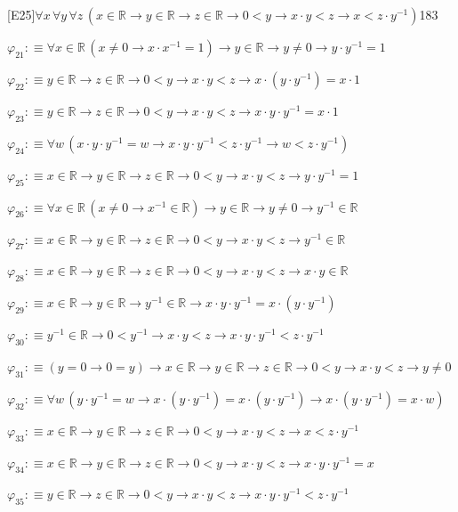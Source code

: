 \begin{fullproof}{[E25]}{$\forall x\,\forall y\,\forall z\,(x \in \mathbb{R} \to y \in \mathbb{R} \to z \in \mathbb{R} \to 0 < y \to x \cdot y < z \to x < z \cdot y^{-1})$}{183}
\begin{abbrevlist}
\item $\varphi_{21} :\equiv \forall x \in \mathbb{R}\,(x \neq 0 \to x \cdot x^{-1} = 1) \to y \in \mathbb{R} \to y \neq 0 \to y \cdot y^{-1} = 1$
\item $\varphi_{22} :\equiv y \in \mathbb{R} \to z \in \mathbb{R} \to 0 < y \to x \cdot y < z \to x \cdot (y \cdot y^{-1}) = x \cdot 1$
\item $\varphi_{23} :\equiv y \in \mathbb{R} \to z \in \mathbb{R} \to 0 < y \to x \cdot y < z \to x \cdot y \cdot y^{-1} = x \cdot 1$
\item $\varphi_{24} :\equiv \forall w\,(x \cdot y \cdot y^{-1} = w \to x \cdot y \cdot y^{-1} < z \cdot y^{-1} \to w < z \cdot y^{-1})$
\item $\varphi_{25} :\equiv x \in \mathbb{R} \to y \in \mathbb{R} \to z \in \mathbb{R} \to 0 < y \to x \cdot y < z \to y \cdot y^{-1} = 1$
\item $\varphi_{26} :\equiv \forall x \in \mathbb{R}\,(x \neq 0 \to x^{-1} \in \mathbb{R}) \to y \in \mathbb{R} \to y \neq 0 \to y^{-1} \in \mathbb{R}$
\item $\varphi_{27} :\equiv x \in \mathbb{R} \to y \in \mathbb{R} \to z \in \mathbb{R} \to 0 < y \to x \cdot y < z \to y^{-1} \in \mathbb{R}$
\item $\varphi_{28} :\equiv x \in \mathbb{R} \to y \in \mathbb{R} \to z \in \mathbb{R} \to 0 < y \to x \cdot y < z \to x \cdot y \in \mathbb{R}$
\item $\varphi_{29} :\equiv x \in \mathbb{R} \to y \in \mathbb{R} \to y^{-1} \in \mathbb{R} \to x \cdot y \cdot y^{-1} = x \cdot (y \cdot y^{-1})$
\item $\varphi_{30} :\equiv y^{-1} \in \mathbb{R} \to 0 < y^{-1} \to x \cdot y < z \to x \cdot y \cdot y^{-1} < z \cdot y^{-1}$
\item $\varphi_{31} :\equiv (y = 0 \to 0 = y) \to x \in \mathbb{R} \to y \in \mathbb{R} \to z \in \mathbb{R} \to 0 < y \to x \cdot y < z \to y \neq 0$
\item $\varphi_{32} :\equiv \forall w\,(y \cdot y^{-1} = w \to x \cdot (y \cdot y^{-1}) = x \cdot (y \cdot y^{-1}) \to x \cdot (y \cdot y^{-1}) = x \cdot w)$
\item $\varphi_{33} :\equiv x \in \mathbb{R} \to y \in \mathbb{R} \to z \in \mathbb{R} \to 0 < y \to x \cdot y < z \to x < z \cdot y^{-1}$
\item $\varphi_{34} :\equiv x \in \mathbb{R} \to y \in \mathbb{R} \to z \in \mathbb{R} \to 0 < y \to x \cdot y < z \to x \cdot y \cdot y^{-1} = x$
\item $\varphi_{35} :\equiv y \in \mathbb{R} \to z \in \mathbb{R} \to 0 < y \to x \cdot y < z \to x \cdot y \cdot y^{-1} < z \cdot y^{-1}$

\end{abbrevlist}
\end{fullproof}

